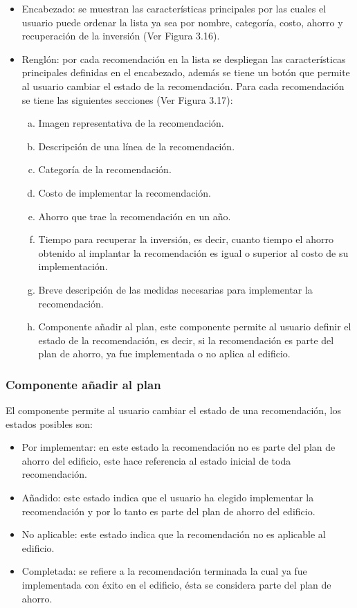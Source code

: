 \begin{itemize}
\item Encabezado: se muestran las características principales por las cuales
  el usuario puede ordenar la lista ya sea por nombre, categoría, costo, ahorro
  y recuperación de la inversión (Ver Figura 3.16).
\item Renglón: por cada recomendación en la lista se despliegan las
  características principales definidas en el encabezado, además se tiene un botón
  que permite al usuario cambiar el estado de la recomendación.
  Para cada recomendación se tiene las siguientes secciones (Ver Figura 3.17):
  \begin{enumerate}[a)]
  \item Imagen representativa de la recomendación.
  \item Descripción de una línea de la recomendación.
  \item Categoría de la recomendación.
  \item Costo de implementar la recomendación.
  \item Ahorro que trae la recomendación en un año.
  \item Tiempo para recuperar la inversión, es decir, cuanto tiempo el ahorro
    obtenido al implantar la recomendación es igual o superior al costo
    de su implementación.
  \item Breve descripción de las medidas necesarias para implementar la
    recomendación.
  \item Componente añadir al plan, este componente permite al usuario definir el
    estado de la recomendación, es decir, si la recomendación es parte
    del plan de ahorro, ya fue implementada o no aplica al edificio.
  \end{enumerate}
\end{itemize}

\subsubsection{Componente añadir al plan}

El componente  permite al usuario cambiar el estado
de una recomendación, los estados posibles son:

\begin{itemize}
\item Por implementar: en este estado la recomendación no es parte
  del plan de ahorro del edificio, este hace referencia al estado inicial de
  toda recomendación.
\item Añadido: este estado indica que el usuario ha elegido implementar la
  recomendación y por lo tanto es parte del plan de ahorro del edificio.
\item No aplicable: este estado indica que la recomendación no es aplicable al
  edificio.
\item Completada: se refiere a la recomendación terminada la cual ya fue implementada
  con éxito en el edificio, ésta se considera parte del plan de ahorro.
\end{itemize}

